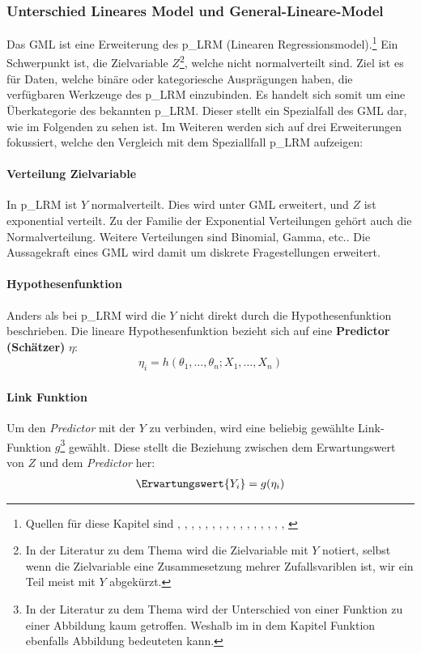 \subsubsection{Unterschied Lineares Model und General-Lineare-Model}

Das \gls{GML} ist eine Erweiterung des \gls{p_LRM} (Linearen Regressionsmodel).\footnote{Quellen für diese Kapitel sind 
	\cite{log.1},
	\cite{log.2},
	\cite{log.3},
	\cite{log.4},
	\cite{log.5},
	\cite{log.6},
	\cite{log.7},
	\cite{log.8},
	\cite{log.9},
	\cite{log.10},
	\cite{log.11},
	\cite{log.12},
	\cite{log.13},
	\cite{log.14},
	\cite{log.15},
	\cite{log.16},
	\cite{log.17}}
Ein Schwerpunkt ist, die Zielvariable $Z$\footnote{In der Literatur zu dem Thema wird die Zielvariable mit $Y$ notiert, selbst wenn die Zielvariable eine Zusammesetzung mehrer Zufallsvariblen ist, wir ein Teil meist mit $Y$ abgekürzt.}, welche nicht normalverteilt sind. Ziel ist es für Daten, welche binäre oder kategoriesche Ausprägungen haben, die verfügbaren Werkzeuge des \gls{p_LRM} einzubinden. Es handelt sich somit um eine Überkategorie des bekannten \gls{p_LRM}. Dieser stellt ein Spezialfall des \gls{GML} dar, wie im Folgenden zu sehen ist. Im Weiteren werden sich auf drei Erweiterungen fokussiert, welche den Vergleich mit dem Speziallfall \gls{p_LRM} aufzeigen:

\paragraph{Verteilung Zielvariable} In \gls{p_LRM} ist $Y$ normalverteilt. Dies wird unter \gls{GML} erweitert, und $Z$ ist exponential verteilt. Zu der Familie der Exponential Verteilungen gehört auch die Normalverteilung. Weitere Verteilungen sind Binomial, Gamma, etc.. Die Aussagekraft eines \gls{GML} wird damit um diskrete Fragestellungen erweitert.

\paragraph{Hypothesenfunktion} Anders als bei \gls{p_LRM} wird die $Y$ nicht direkt durch die Hypothesenfunktion beschrieben. Die lineare Hypothesenfunktion bezieht sich auf eine \textbf{Predictor (Schätzer)} $\eta$:
\begin{align}
	\eta_i =  h(\theta_1,\dots, \theta_n; X_1, \dots, X_n)
\end{align}

\paragraph{Link Funktion}
Um den \textit{Predictor} mit der $Y$ zu verbinden, wird eine beliebig gewählte Link-Funktion $g$\footnote{In der Literatur zu dem Thema wird der Unterschied von einer Funktion zu einer Abbildung kaum getroffen. Weshalb im in dem Kapitel Funktion ebenfalls Abbildung bedeuteten kann.} gewählt. Diese stellt die Beziehung zwischen dem Erwartungswert von $Z$ und dem \textit{Predictor} her:
\begin{align}
	\Erwartungswert{Y_i}= g(\eta_i)
\end{align}


